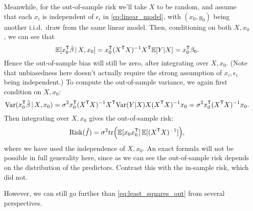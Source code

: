 \documentclass{article}
\begin{document}
Meanwhile, for the out-of-sample risk we'll take $X$ to be random, and assume
that each $x_i$ is independent of $\epsilon_i$ in \eqref{eq:linear_model}, with 
$(x_0,y_0)$ being another i.i.d.\ draw from the same linear model. Then,
conditioning on both $X,x_0$, we can see that
\[
\mathbb{E} [x_0^{\mathsf{T}} \hat{\beta} \,|\, X,x_0] = x_0^{\mathsf{T}} (X^{\mathsf{T}} X)^{-1} X^{\mathsf{T}} \mathbb{E}[Y|X] = x_0^{\mathsf{T}} \beta_0.   
\]
Hence the out-of-sample bias will still be zero, after integrating over
$X,x_0$. (Note that unbiasedness here doesn't actually require the strong
assumption of $x_i,\epsilon_i$ being independent.) To compute the out-of-sample 
variance, we again first condition on $X,x_0$:
\[
\mathrm{Var}(x_0^{\mathsf{T}} \hat{\beta} \,|\, X, x_0) = \sigma^2 x_0^{\mathsf{T}} (X^{\mathsf{T}} X)^{-1} X^{\mathsf{T}} \mathrm{Var}(Y|X)
X (X^{\mathsf{T}} X)^{-1} x_0 = \sigma^2 x_0^{\mathsf{T}} (X^{\mathsf{T}} X)^{-1} x_0.
\]
Then integrating over $X,x_0$ gives the out-of-sample risk:
\begin{equation}
\label{eq:least_squares_out}
\mathrm{Risk}(\hat{f}) = \sigma^2 \mathrm{tr}\Big(\mathbb{E} [x_0 x_0^{\mathsf{T}}] \, \mathbb{E} [(X^{\mathsf{T}} X)^{-1}] \Big), 
\end{equation}
where we have used the independence of $X,x_0$. An exact formula will not be
possible in full generality here, since as we can see the out-of-sample risk
depends on the distribution of the predictors.  Contrast this with the in-sample
risk, which did not.

However, we can still go further than \eqref{eq:least_squares_out} from several
perspectives.   
\end{document}
